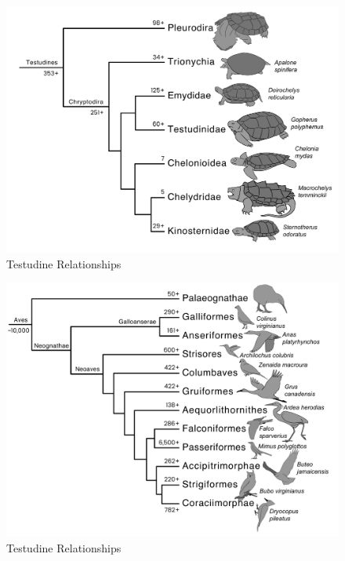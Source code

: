 \documentclass[a4paper,12pt]{article}
\begin{document}
\begin{figure}[H]
\centering
  \includegraphics[scale=0.3]{Testudines_tre.pdf}
  \caption{Testudine Relationships}
  \label{fig:Testudines}
\end{figure}

\begin{figure}[H]
\centering
  \includegraphics[scale=0.3]{Aves_tre.pdf}
  \caption{Testudine Relationships}
  \label{fig:Testudines}
\end{figure}
\end{document}
